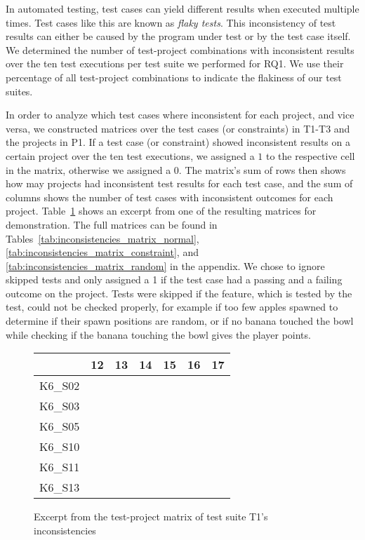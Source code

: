 \noindent In automated testing, test cases can yield different results when executed multiple times.
Test cases like this are known as \textit{flaky tests}.
This inconsistency of test results can either be caused by the program under test or by the test case itself.
We determined the number of test-project combinations with inconsistent results over the ten test executions per test suite we performed for RQ1.
We use their percentage of all test-project combinations to indicate the flakiness of our test suites.
\parspace

In order to analyze which test cases where inconsistent for each project, and vice versa,
we constructed matrices over the test cases (or constraints) in T1-T3 and the projects in P1.
If a test case (or constraint) showed inconsistent results on a certain project over the ten test executions,
we assigned a $1$ to the respective cell in the matrix, otherwise we assigned a 0.
The matrix's sum of rows then shows how may projects had inconsistent test results for each test case,
and the sum of columns shows the number of test cases with inconsistent outcomes for each project.
Table~\ref{tab:inconsistency_matrices_excerpt} shows an excerpt from one of the resulting matrices for demonstration.
The full matrices can be found in Tables~\ref{tab:inconsistencies_matrix_normal}, \ref{tab:inconsistencies_matrix_constraint}, and \ref{tab:inconsistencies_matrix_random} in the appendix.
We chose to ignore skipped tests
and only assigned a 1 if the test case had a passing and a failing outcome on the project.
Tests were skipped if the feature, which is tested by the test, could not be checked properly,
for example if too few apples spawned to determine if their spawn positions are random,
or if no banana touched the bowl while checking if the banana touching the bowl gives the player points.
\parspace

\begin{figure}[htpb]
    \centering

    \setlength{\tabcolsep}{0.2em}
    \tiny
    \begin{tabular}{l|rrrrrr}
        \toprule
                & 12 & 13 & 14 & 15 & 16 & 17 \\
        \midrule
        K6\_S02 & \n & \e & \n & \n & \n & \n \\
        K6\_S03 & \n & \e & \n & \n & \n & \n \\
        K6\_S05 & \n & \n & \n & \n & \n & \n \\
        K6\_S10 & \n & \e & \e & \n & \n & \n \\
        K6\_S11 & \n & \n & \n & \n & \n & \n \\
        K6\_S13 & \n & \n & \n & \n & \n & \n \\
        \bottomrule
    \end{tabular}
    \setlength{\tabcolsep}{\defaulttabcolsep}

    \caption{Excerpt from the test-project matrix of test suite T1's inconsistencies}
    \label{tab:inconsistency_matrices_excerpt}
\end{figure}

